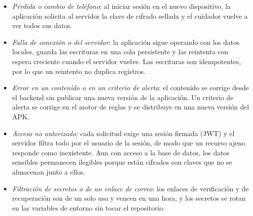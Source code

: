 \begin{itemize}
    \item \emph{Pérdida o cambio de teléfono}: al iniciar sesión en el nuevo
    dispositivo, la aplicación solicita al servidor la clave de cifrado sellada
    y el cuidador vuelve a ver todos sus datos.
    \item \emph{Falla de conexión o del servidor}: la aplicación sigue operando
    con los datos locales, guarda las escrituras en una cola persistente y las
    reintenta con espera creciente cuando el servidor vuelve. Las escrituras
    son idempotentes, por lo que un reintento no duplica registros.
    \item \emph{Error en un contenido o en un criterio de alerta}: el contenido
    se corrige desde el backend sin publicar una nueva versión de la aplicación.
    Un criterio de alerta se corrige en el motor de reglas y se distribuye en una
    nueva versión del APK.
    \item \emph{Acceso no autorizado}: cada solicitud exige una sesión firmada
    (JWT) y el servidor filtra todo por el usuario de la sesión, de modo que un
    recurso ajeno responde como inexistente. Aun con acceso a la base de datos,
    los datos sensibles permanecen ilegibles porque están cifrados con claves
    que no se almacenan junto a ellos.
    \item \emph{Filtración de secretos o de un enlace de correo}: los enlaces de
    verificación y de recuperación son de un solo uso y vencen en una hora, y
    los secretos se rotan en las variables de entorno sin tocar el repositorio.
\end{itemize}
